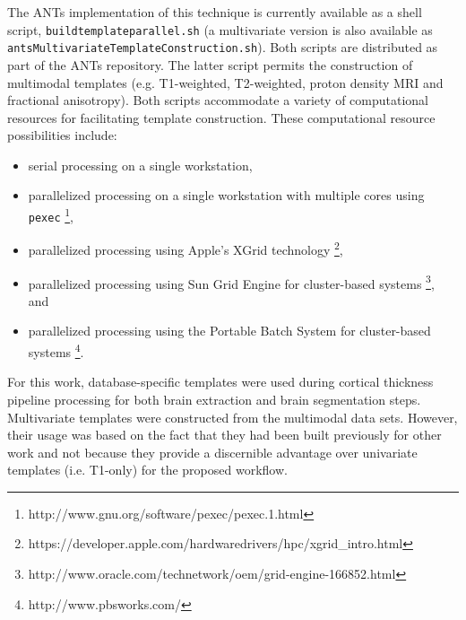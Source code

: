 The ANTs implementation of this technique is currently available as a shell script, 
\verb#buildtemplateparallel.sh# (a multivariate version is also available as
\verb#antsMultivariateTemplateConstruction.sh#).  Both scripts are distributed as part of
 the ANTs repository.
The latter script permits the construction of multimodal templates (e.g. 
T1-weighted, T2-weighted, proton density MRI and fractional anisotropy).  
Both scripts accommodate a variety of computational resources
for facilitating template construction.  These computational resource possibilities include:
\begin{itemize}
  \item serial processing on a single workstation, 
  \item parallelized processing on a single workstation with multiple cores using \verb#pexec#%
  \footnote{http://www.gnu.org/software/pexec/pexec.1.html},
  \item parallelized processing using Apple's XGrid technology%
  \footnote{https://developer.apple.com/hardwaredrivers/hpc/xgrid\_intro.html}, 
  \item parallelized processing using Sun Grid Engine for cluster-based systems%
  \footnote{http://www.oracle.com/technetwork/oem/grid-engine-166852.html}, and 
  \item parallelized processing using the Portable Batch System for cluster-based systems%
  \footnote{http://www.pbsworks.com/}.
\end{itemize}

For this work, database-specific templates were used during cortical thickness pipeline
processing for both brain extraction and brain segmentation steps.  Multivariate templates 
were constructed from the multimodal data sets.  However, their usage was based on the 
fact that they had been built previously for other work and not because they provide a 
discernible advantage over univariate templates (i.e. T1-only) for the proposed workflow.

